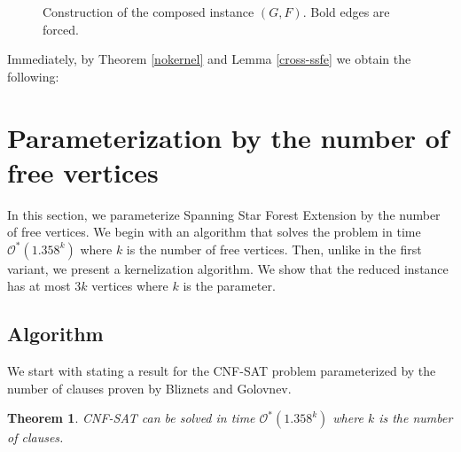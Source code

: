 \documentclass[en]{pracamgr}
\newtheorem{theorem}{Theorem}
\theoremstyle{definition}
\newcommand{\ssfep}{{\sc Spanning Star Forest Extension}}
\newcommand{\cnfsat}{{\sc CNF-SAT}}
\begin{document}
\begin{figure}
	\caption{Construction of the composed instance $(G,F)$. Bold edges are forced.}
	\label{fig1}
\end{figure}


Immediately, by Theorem \ref{nokernel} and Lemma \ref{cross-ssfe} we obtain the following:

\thmssfepnokernel*

\section{Parameterization by the number of free vertices}

In this section, we parameterize  \ssfep{} by the number of free vertices. We begin with an algorithm that solves the problem in time $\mathcal{O}^*(1.358^k)$ where $k$ is the number of free vertices. Then, unlike in the first variant, we present a kernelization algorithm. We show that the reduced instance has at most $3k$ vertices where $k$ is the parameter.

\subsection{Algorithm}
We start with stating a result for the \cnfsat{} problem parameterized by the number of clauses proven by Bliznets and Golovnev. \cite{MAXSAT}

\begin{theorem}\label{cnfsatmtime}
	\cnfsat{} can be solved in time $\mathcal{O}^*(1.358^k)$ where $k$ is the number of clauses.
\end{theorem}
\end{document}
